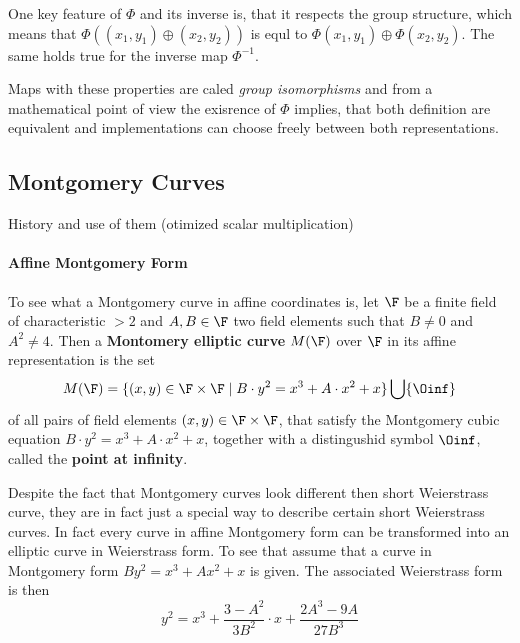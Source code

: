 One key feature of $\Phi$ and its inverse is, that it respects the group structure, which means that $\Phi((x_1,y_1)\oplus (x_2,y_2))$ is equl to $\Phi(x_1,y_1)\oplus \Phi(x_2,y_2)$. The same holds true for the inverse map $\Phi^{-1}$.

Maps with these properties are caled \textit{group isomorphisms} and from a mathematical point of view the exisrence of $\Phi$ implies, that both definition are equivalent and implementations can choose freely between both representations. 


\subsection{Montgomery Curves}
History and use of them (otimized scalar multiplication)

\paragraph{Affine Montgomery Form}
To see what a Montgomery curve in affine coordinates is, let $\F$ be a finite field of characteristic $>2$ and $A,B\in \F$ two field elements such that $B\neq 0$ and $A^2 \neq 4$. Then a \textbf{Montomery elliptic curve} $M(\F)$ over $\F$ in its affine representation is the set
\begin{equation}
\label{def_short_weierstrass_curve}
M(\F) = \{(x,y)\in \F\times \F\;|\; B\cdot y^2 = x^3 + A\cdot x^2 + x  \} \bigcup \{\Oinf\}
\end{equation}
of all pairs of field elements $(x,y)\in \F\times \F$, that satisfy the Montgomery cubic equation $B\cdot y^2 = x^3 + A\cdot x^2 + x$, together with a distingushid symbol $\Oinf$, called the \textbf{point at infinity}.

Despite the fact that Montgomery curves look different then short Weierstrass curve, they are in fact just a special way to describe certain short Weierstrass curves. In fact every curve in affine Montgomery form can be transformed into an elliptic curve in Weierstrass form. To see that assume that a curve in Montgomery form $B y^2 = x^3 + A x^2 + x$ is given. The associated Weierstrass form is then
$$
y^2 = x^3 + \frac{3-A^2}{3B^2}\cdot x + \frac{2A^3-9A}{27B^3}
$$
 

